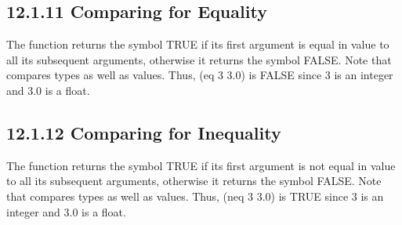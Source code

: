 \documentclass[letterpaper,10pt,english]{sphinxmanual}
\begin{document}

\begin{sphinxVerbatim}[commandchars=\\\{\}]
 
\end{sphinxVerbatim}


\subsection{12.1.11 Comparing for Equality}
\label{\detokenize{actions:comparing-for-equality}}
The  function returns the symbol TRUE if its first argument is
equal in value to all its subsequent arguments, otherwise it returns the
symbol FALSE. Note that  compares types as well as values. Thus,
(eq 3 3.0) is FALSE since 3 is an integer and 3.0 is a float.


\begin{sphinxVerbatim}[commandchars=\\\{\}]
  
\end{sphinxVerbatim}


\begin{sphinxVerbatim}[commandchars=\\\{\}]
     
     
   
\end{sphinxVerbatim}


\subsection{12.1.12 Comparing for Inequality}
\label{\detokenize{actions:comparing-for-inequality}}
The  function returns the symbol TRUE if its first argument is
not equal in value to all its subsequent arguments, otherwise it returns
the symbol FALSE. Note that  compares types as well as values.
Thus, (neq 3 3.0) is TRUE since 3 is an integer and 3.0 is a float.
\end{document}
